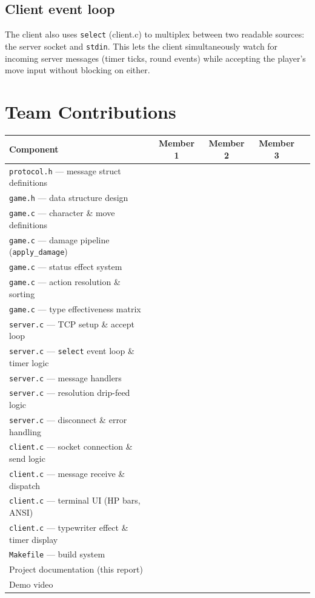 \documentclass[11pt,letterpaper]{article}
\begin{document}
\subsection*{Client event loop}

The client also uses \texttt{select} (client.c) to multiplex between two readable sources: the server socket and \texttt{stdin}. This lets the client simultaneously watch for incoming server messages (timer ticks, round events) while accepting the player's move input without blocking on either.

\section{Team Contributions}

\begin{center}
\begin{tabular}{@{}lcccc@{}}
\toprule
\textbf{Component} & \textbf{Member 1} & \textbf{Member 2} & \textbf{Member 3} \\
\midrule
\texttt{protocol.h} --- message struct definitions & & & \\
\texttt{game.h} --- data structure design & & & \\
\texttt{game.c} --- character \& move definitions & & & \\
\texttt{game.c} --- damage pipeline (\texttt{apply\_damage}) & & & \\
\texttt{game.c} --- status effect system & & & \\
\texttt{game.c} --- action resolution \& sorting & & & \\
\texttt{game.c} --- type effectiveness matrix & & & \\
\texttt{server.c} --- TCP setup \& accept loop & & & \\
\texttt{server.c} --- \texttt{select} event loop \& timer logic & & & \\
\texttt{server.c} --- message handlers & & & \\
\texttt{server.c} --- resolution drip-feed logic & & & \\
\texttt{server.c} --- disconnect \& error handling & & & \\
\texttt{client.c} --- socket connection \& send logic & & & \\
\texttt{client.c} --- message receive \& dispatch & & & \\
\texttt{client.c} --- terminal UI (HP bars, ANSI) & & & \\
\texttt{client.c} --- typewriter effect \& timer display & & & \\
\texttt{Makefile} --- build system & & & \\
Project documentation (this report) & & & \\
Demo video & & & \\
\bottomrule
\end{tabular}
\end{center}
\end{document}
